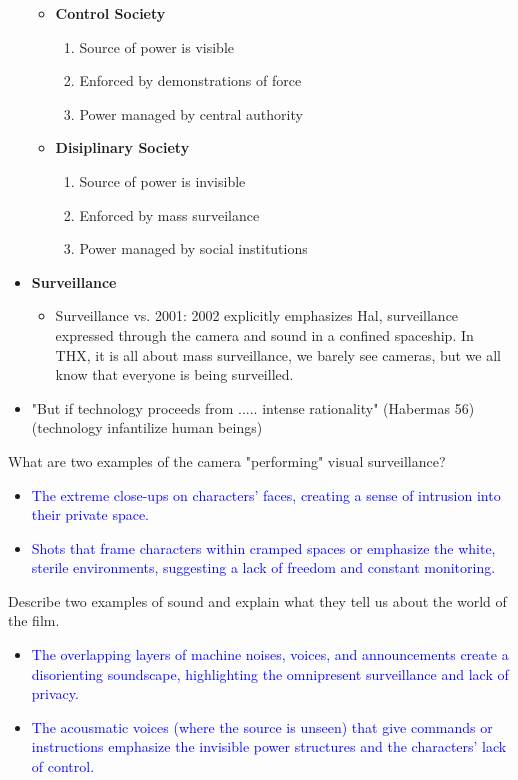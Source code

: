 \documentclass[11pt,fleqn]{book}
\begin{document}
\begin{itemize}
\begin{itemize}
        \item \textbf{Control Society}
        \begin{enumerate}
            \item Source of power is visible
            \item Enforced by demonstrations of force
            \item Power managed by central authority
        \end{enumerate}
        \item \textbf{Disiplinary Society}
        \begin{enumerate}
            \item Source of power is invisible
            \item Enforced by mass surveilance
            \item Power managed by social institutions
        \end{enumerate}
    \end{itemize}
    \item \textbf{Surveillance}
    \begin{itemize}
        \item Surveillance vs. 2001: 2002 explicitly emphasizes Hal, surveillance expressed through the camera and sound in a confined spaceship. In THX, it is all about mass surveillance, we barely see cameras, but we all know that everyone is being surveilled.
    \end{itemize}
    \item "But if technology proceeds from ..... intense rationality" (Habermas 56) (technology infantilize human beings)
\end{itemize}
\begin{exercise}
What are two examples of the camera "performing" visual surveillance?
\begin{itemize}
\item \textcolor{blue}{The extreme close-ups on characters' faces, creating a sense of intrusion into their private space.}
\item \textcolor{blue}{Shots that frame characters within cramped spaces or emphasize the white, sterile environments, suggesting a lack of freedom and constant monitoring.}
\end{itemize}
\end{exercise}

\begin{exercise}
Describe two examples of sound and explain what they tell us about the world of the film.
\begin{itemize}
\item \textcolor{blue}{The overlapping layers of machine noises, voices, and announcements create a disorienting soundscape, highlighting the omnipresent surveillance and lack of privacy.}
\item \textcolor{blue}{The acousmatic voices (where the source is unseen) that give commands or instructions emphasize the invisible power structures and the characters' lack of control.}
\end{itemize}
\end{exercise}
\end{document}
